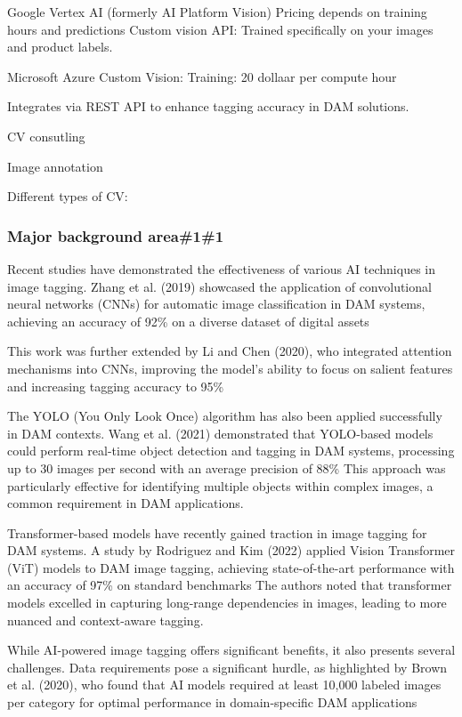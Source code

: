 \documentclass[a4paper,10pt,twocolumn]{article}
\numberwithin{figure}{section}
\numberwithin{table}{section}
\begin{document}
Google Vertex AI (formerly AI Platform Vision)
Pricing depends on training hours and predictions
Custom vision API: Trained specifically on your images and product labels.

Microsoft Azure Custom Vision: Training: 20 dollaar per compute hour 

Integrates via REST API to enhance tagging accuracy in DAM solutions.

CV consutling 

Image annotation 

Different types of CV:


\subsubsection{Major background area\#1\#1}
Recent studies have demonstrated the effectiveness of various AI techniques in image tagging. 
Zhang et al. (2019) showcased the application of convolutional neural networks (CNNs) for automatic 
image classification in DAM systems, achieving an accuracy of 92\% on a diverse dataset of digital assets

This work was further extended by Li 
and Chen (2020), who integrated attention mechanisms into CNNs, improving the model's ability to focus on 
salient features and increasing tagging accuracy to 95\%

The YOLO (You Only Look Once) algorithm has also been applied successfully in DAM contexts. 
Wang et al. (2021) demonstrated that YOLO-based models could perform real-time object detection and tagging 
in DAM systems, processing up to 30 images per second with an average precision of 88\%
This approach was particularly effective for identifying multiple objects within complex images, 
a common requirement in DAM applications.

Transformer-based models have recently gained traction in image tagging for DAM systems. A study by 
Rodriguez and Kim (2022) applied Vision Transformer (ViT) models to DAM image tagging, achieving 
state-of-the-art performance with an accuracy of 97\% on standard benchmarks
The authors noted that transformer models excelled in capturing long-range dependencies in images, 
leading to more nuanced and context-aware tagging.


While AI-powered image tagging offers significant benefits, it also presents several challenges. Data requirements 
pose a significant hurdle, as highlighted by Brown et al. (2020), who found that AI models required at 
least 10,000 labeled images per category for optimal performance in domain-specific DAM applications
\end{document}
